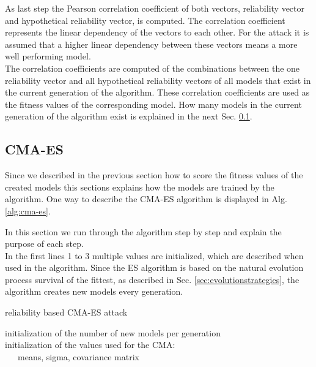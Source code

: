 As last step the Pearson correlation coefficient of both vectors, reliability vector and hypothetical reliability vector, is computed.
The correlation coefficient represents the linear dependency of the vectors to each other.
For the attack it is assumed that a higher linear dependency between these vectors means a more well performing model.\\
The correlation coefficients are computed of the combinations between the one reliability vector and all hypothetical reliability vectors of all models that exist in the current generation of the algorithm.
These correlation coefficients are used as the fitness values of the corresponding model.
How many models in the current generation of the algorithm exist is explained in the next Sec. \ref{sec:cma-esdesign}.


\subsection{CMA-ES}
\label{sec:cma-esdesign}

Since we described in the previous section how to score the fitness values of the created models this sections explains how the models are trained by the algorithm.
One way to describe the \ac{CMA-ES} algorithm is displayed in Alg. \ref{alg:cma-es}.

In this section we run through the algorithm step by step and explain the purpose of each step.\\
In the first lines 1 to 3 multiple values are initialized, which are described when used in the algorithm.
Since the \ac{ES} algorithm is based on the natural evolution process survival of the fittest, as described in Sec. \ref{sec:evolutionstrategies}, the algorithm creates new models every generation. %

\SetAlCapHSkip{0.2em}
\begin{algorithm}[H] %
\Indm
\SetAlgoLined
\caption{reliability based \acl{CMA-ES} attack}
\label{alg:cma-es}
\Indp

initialization of the number of new models per generation\\
initialization of the values used for the \ac{CMA}:\\
\ \ \ means, sigma, covariance matrix\\
\end{algorithm}

